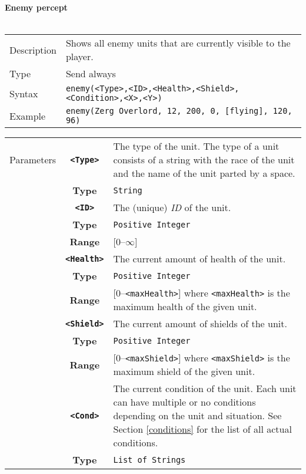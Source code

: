 \noindent
\textbf{Enemy percept}\\
\\
\begin{tabularx}{\textwidth}{lX}
 Description & Shows all enemy units that are currently visible to the player. \\
 Type & Send always \\
 Syntax & \verb|enemy(<Type>,<ID>,<Health>,<Shield>,<Condition>,<X>,<Y>)| \\
 Example & \verb|enemy(Zerg Overlord, 12, 200, 0, [flying], 120, 96)| \\ 
 \end{tabularx}
 \begin{tabularx}{\textwidth}{l | c | p{8cm}|}
 \cline{2-3} 
 Parameters & \textbf{\verb|<Type>|} & The type of the unit. The type of a unit consists of a string with the race of            the unit and the name of the unit parted by a space. \\
            & \textbf{Type} & \verb|String| \\
            \cline{2-3} 
            & \textbf{\verb|<ID>|} & The (unique) \textit{ID} of the unit.\\
            & \textbf{Type} & \verb|Positive Integer| \\
            & \textbf{Range} & [0--$\infty$] \\
            \cline{2-3} 
            & \textbf{\verb|<Health>|} & The current amount of health of the unit.\\
            & \textbf{Type} & \verb|Positive Integer| \\
            & \textbf{Range} & [0--\verb|<maxHealth>|] where \verb|<maxHealth>| is the maximum health of the given unit.\\
            \cline{2-3} 
            & \textbf{\verb|<Shield>|} & The current amount of shields of the unit. \\
            & \textbf{Type} & \verb|Positive Integer| \\
            & \textbf{Range} & [0--\verb|<maxShield>|] where \verb|<maxShield>| is the maximum shield of the given unit. \\
            \cline{2-3} 
            & \textbf{\verb|<Cond>|} & The current condition of the unit. Each unit can have multiple or no conditions depending on the unit and situation. See Section \ref{conditions} for the list of all actual conditions.\\ 
            & \textbf{Type} & \verb|List of Strings| \\

\end{tabularx}
